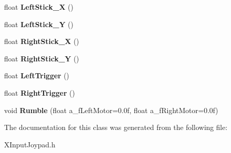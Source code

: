 \begin{DoxyCompactItemize}
\item 
\hypertarget{class_arena_1_1_x_input_joypad_abda8f4669978092eb5810cf05294fb99}{float {\bfseries Left\+Stick\+\_\+\+X} ()}\label{class_arena_1_1_x_input_joypad_abda8f4669978092eb5810cf05294fb99}

\item 
\hypertarget{class_arena_1_1_x_input_joypad_a79b28a18255b247a30e94504f1b8f5ba}{float {\bfseries Left\+Stick\+\_\+\+Y} ()}\label{class_arena_1_1_x_input_joypad_a79b28a18255b247a30e94504f1b8f5ba}

\item 
\hypertarget{class_arena_1_1_x_input_joypad_a1fbe4496ceff57fc7bd5b998fdfe70cd}{float {\bfseries Right\+Stick\+\_\+\+X} ()}\label{class_arena_1_1_x_input_joypad_a1fbe4496ceff57fc7bd5b998fdfe70cd}

\item 
\hypertarget{class_arena_1_1_x_input_joypad_af9a2853e06fe0636e2f5e0b5a48c6364}{float {\bfseries Right\+Stick\+\_\+\+Y} ()}\label{class_arena_1_1_x_input_joypad_af9a2853e06fe0636e2f5e0b5a48c6364}

\item 
\hypertarget{class_arena_1_1_x_input_joypad_a30681d9a51ba343b07c6393de4e9bd3e}{float {\bfseries Left\+Trigger} ()}\label{class_arena_1_1_x_input_joypad_a30681d9a51ba343b07c6393de4e9bd3e}

\item 
\hypertarget{class_arena_1_1_x_input_joypad_a3a945b9e572aa0322f447d55f3687607}{float {\bfseries Right\+Trigger} ()}\label{class_arena_1_1_x_input_joypad_a3a945b9e572aa0322f447d55f3687607}

\item 
\hypertarget{class_arena_1_1_x_input_joypad_a37440e92dc13eba9bea6d01471fa70c9}{void {\bfseries Rumble} (float a\+\_\+f\+Left\+Motor=0.\+0f, float a\+\_\+f\+Right\+Motor=0.\+0f)}\label{class_arena_1_1_x_input_joypad_a37440e92dc13eba9bea6d01471fa70c9}

\end{DoxyCompactItemize}


The documentation for this class was generated from the following file\+:\begin{DoxyCompactItemize}
\item 
X\+Input\+Joypad.\+h\end{DoxyCompactItemize}
